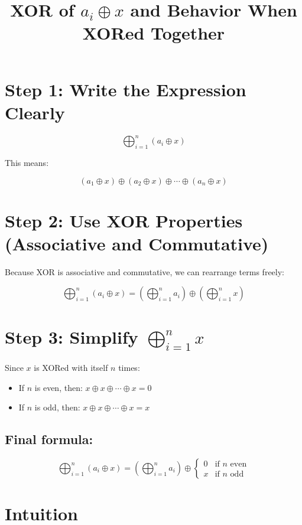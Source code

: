 \documentclass{article}
\title{XOR of \( a_i \oplus x \) and Behavior When XORed Together}
\date{}
\begin{document}
\maketitle

\section*{Step 1: Write the Expression Clearly}

\[
\bigoplus_{i=1}^{n} (a_i \oplus x)
\]

This means:

\[
(a_1 \oplus x) \oplus (a_2 \oplus x) \oplus \cdots \oplus (a_n \oplus x)
\]

\section*{Step 2: Use XOR Properties (Associative and Commutative)}

Because XOR is associative and commutative, we can rearrange terms freely:

\[
\bigoplus_{i=1}^{n} (a_i \oplus x) = \left( \bigoplus_{i=1}^{n} a_i \right) \oplus \left( \bigoplus_{i=1}^{n} x \right)
\]

\section*{Step 3: Simplify \( \bigoplus_{i=1}^{n} x \)}

Since \( x \) is XORed with itself \( n \) times:

\begin{itemize}
  \item If \( n \) is even, then: \( x \oplus x \oplus \cdots \oplus x = 0 \)
  \item If \( n \) is odd, then: \( x \oplus x \oplus \cdots \oplus x = x \)
\end{itemize}

\subsection*{Final formula:}

\[
\bigoplus_{i=1}^{n} (a_i \oplus x) = 
\left( \bigoplus_{i=1}^{n} a_i \right) \oplus 
\begin{cases}
0 & \text{if } n \text{ even} \\
x & \text{if } n \text{ odd}
\end{cases}
\]

\section*{Intuition}
\end{document}
